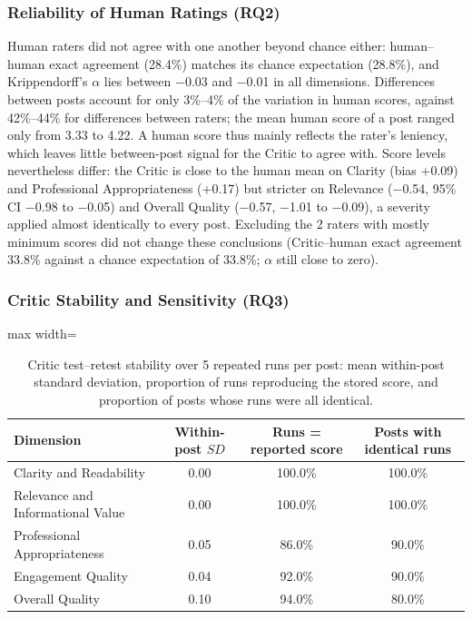 \documentclass[a4paper,twoside]{article}
\newcommand{\HHexAll}{28.4\%}
\newcommand{\HHchanceExAll}{28.8\%}
\newcommand{\BiasCla}{+0.09}
\newcommand{\BiasRel}{$-$0.54}
\newcommand{\BiasLoRel}{$-$0.98}
\newcommand{\BiasHiRel}{$-$0.05}
\newcommand{\BiasPro}{+0.17}
\newcommand{\BiasOve}{$-$0.57}
\newcommand{\BiasLoOve}{$-$1.01}
\newcommand{\BiasHiOve}{$-$0.09}
\newcommand{\VarPostMin}{3\%}
\newcommand{\VarPostMax}{4\%}
\newcommand{\VarRaterMin}{42\%}
\newcommand{\VarRaterMax}{44\%}
\newcommand{\AlphaMin}{$-$0.03}
\newcommand{\AlphaMax}{$-$0.01}
\newcommand{\FlaggedN}{2}
\newcommand{\PostMeanMin}{3.33}
\newcommand{\PostMeanMax}{4.22}
\newcommand{\SensCHexAll}{33.8\%}
\newcommand{\SensChanceExAll}{33.8\%}
\newcommand{\RepRuns}{5}
\begin{document}
\subsubsection{Reliability of Human Ratings (RQ2)}

Human raters did not agree with one another beyond chance either: human--human exact agreement (\HHexAll{}) matches its chance expectation (\HHchanceExAll{}), and Krippendorff's $\alpha$ lies between \AlphaMin{} and \AlphaMax{} in all dimensions. Differences between posts account for only \VarPostMin{}--\VarPostMax{} of the variation in human scores, against \VarRaterMin{}--\VarRaterMax{} for differences between raters; the mean human score of a post ranged only from \PostMeanMin{} to \PostMeanMax{}. A human score thus mainly reflects the rater's leniency, which leaves little between-post signal for the Critic to agree with. Score levels nevertheless differ: the Critic is close to the human mean on Clarity (bias \BiasCla{}) and Professional Appropriateness (\BiasPro{}) but stricter on Relevance (\BiasRel{}, 95\% CI \BiasLoRel{} to \BiasHiRel{}) and Overall Quality (\BiasOve{}, \BiasLoOve{} to \BiasHiOve{}), a severity applied almost identically to every post. Excluding the \FlaggedN{} raters with mostly minimum scores did not change these conclusions (Critic--human exact agreement \SensCHexAll{} against a chance expectation of \SensChanceExAll{}; $\alpha$ still close to zero).

\subsubsection{Critic Stability and Sensitivity (RQ3)}

\begin{table}[t]
\centering
\caption{Critic test--retest stability over \RepRuns{} repeated runs per post: mean within-post standard deviation, proportion of runs reproducing the stored score, and proportion of posts whose runs were all identical.}
\label{tab:repeat}
\begin{adjustbox}{max width=\columnwidth}
\begin{tabular}{lccc}
\toprule
Dimension & Within-post $SD$ & Runs = reported score & Posts with identical runs \\
\midrule
Clarity and Readability & 0.00 & 100.0\% & 100.0\% \\
Relevance and Informational Value & 0.00 & 100.0\% & 100.0\% \\
Professional Appropriateness & 0.05 & 86.0\% & 90.0\% \\
Engagement Quality & 0.04 & 92.0\% & 90.0\% \\
Overall Quality & 0.10 & 94.0\% & 80.0\% \\
\bottomrule
\end{tabular}
\end{adjustbox}
\end{table}
\end{document}
